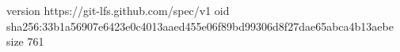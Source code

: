 version https://git-lfs.github.com/spec/v1
oid sha256:33b1a56907e6423e0c4013aaed455e06f89bd99306d8f27dae65abca4b13aebe
size 761
